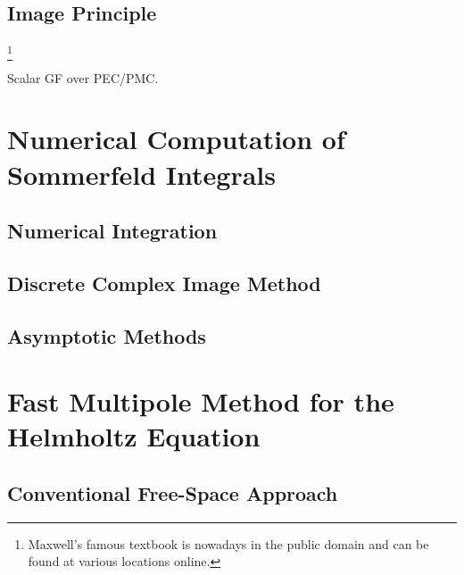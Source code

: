\section{Image Principle}
\label{sec:imgage_principle}

\cite[Chapter~XI]{maxwell1873}\footnote{Maxwell's famous textbook
\cite{maxwell1873} is nowadays in the public domain and can be found at various
locations online.}

Scalar GF over PEC/PMC. \cite[p. 250]{Sommerfeld1964}






\chapter{Numerical Computation of Sommerfeld Integrals}





\section{Numerical Integration}

\section{Discrete Complex Image Method}

\section{Asymptotic Methods}







\chapter{Fast Multipole Method for the Helmholtz Equation}
\label{ch:fmm}






\section{Conventional Free-Space Approach}

